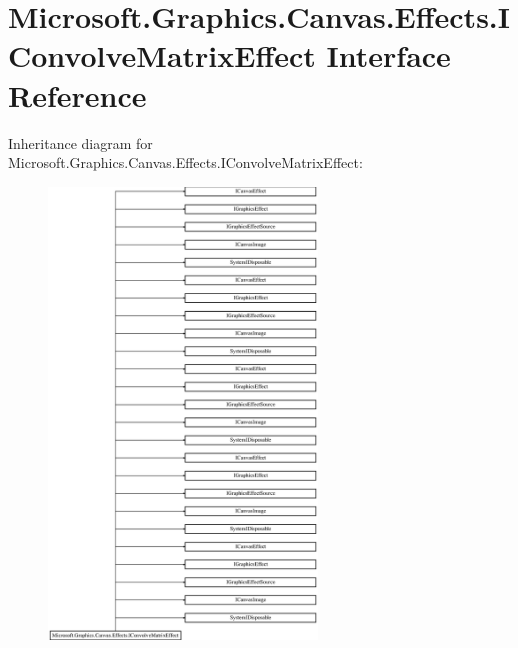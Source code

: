 \hypertarget{interface_microsoft_1_1_graphics_1_1_canvas_1_1_effects_1_1_i_convolve_matrix_effect}{}\section{Microsoft.\+Graphics.\+Canvas.\+Effects.\+I\+Convolve\+Matrix\+Effect Interface Reference}
\label{interface_microsoft_1_1_graphics_1_1_canvas_1_1_effects_1_1_i_convolve_matrix_effect}
Inheritance diagram for Microsoft.\+Graphics.\+Canvas.\+Effects.\+I\+Convolve\+Matrix\+Effect\+:\begin{figure}[H]
\begin{center}
\leavevmode
\includegraphics[height=12.000000cm]{interface_microsoft_1_1_graphics_1_1_canvas_1_1_effects_1_1_i_convolve_matrix_effect}
\end{center}
\end{figure}
